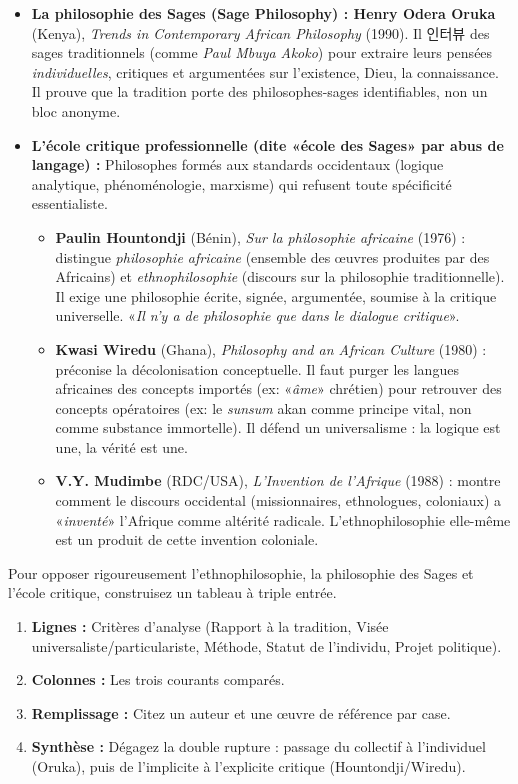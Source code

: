 \documentclass[11pt]{article}
\newcommand{\cle}[1]{{\popxbold\color{popdark}#1}}
\begin{document}
\begin{itemize}
    \item \textbf{La philosophie des Sages (Sage Philosophy) : Henry Odera Oruka} (Kenya), \emph{Trends in Contemporary African Philosophy} (1990). Il 인터뷰 des sages traditionnels (comme \emph{Paul Mbuya Akoko}) pour extraire leurs pensées \emph{individuelles}, critiques et argumentées sur l'existence, Dieu, la connaissance. Il prouve que la tradition porte des \cle{philosophes-sages} identifiables, non un bloc anonyme.
    \item \textbf{L'école critique professionnelle (dite «\cle{école des Sages}» par abus de langage) :} Philosophes formés aux standards occidentaux (logique analytique, phénoménologie, marxisme) qui refusent toute spécificité essentialiste.
    \begin{itemize}
        \item \textbf{Paulin Hountondji} (Bénin), \emph{Sur la philosophie africaine} (1976) : distingue \emph{philosophie africaine} (ensemble des œuvres produites par des Africains) et \emph{ethnophilosophie} (discours sur la philosophie traditionnelle). Il exige une \cle{philosophie écrite}, \cle{signée}, \cle{argumentée}, soumise à la critique universelle. «\emph{Il n'y a de philosophie que dans le dialogue critique}».
        \item \textbf{Kwasi Wiredu} (Ghana), \emph{Philosophy and an African Culture} (1980) : préconise la \cle{décolonisation conceptuelle}. Il faut purger les langues africaines des concepts importés (ex: «\emph{âme}» chrétien) pour retrouver des concepts opératoires (ex: le \emph{sunsum} akan comme principe vital, non comme substance immortelle). Il défend un \cle{universalisme} : la logique est une, la vérité est une.
        \item \textbf{V.Y. Mudimbe} (RDC/USA), \emph{L'Invention de l'Afrique} (1988) : montre comment le discours occidental (missionnaires, ethnologues, coloniaux) a «\emph{inventé}» l'Afrique comme altérité radicale. L'ethnophilosophie elle-même est un produit de cette invention coloniale.
    \end{itemize}
\end{itemize}

\begin{methode}
Pour opposer rigoureusement l'ethnophilosophie, la philosophie des Sages et l'école critique, construisez un tableau à triple entrée.
\begin{enumerate}
    \item \textbf{Lignes :} Critères d'analyse (Rapport à la tradition, Visée universaliste/particulariste, Méthode, Statut de l'individu, Projet politique).
    \item \textbf{Colonnes :} Les trois courants comparés.
    \item \textbf{Remplissage :} Citez un auteur et une œuvre de référence par case.
    \item \textbf{Synthèse :} Dégagez la double rupture : passage du collectif à l'individuel (Oruka), puis de l'implicite à l'explicite critique (Hountondji/Wiredu).
\end{enumerate}
\end{methode}
\end{document}
